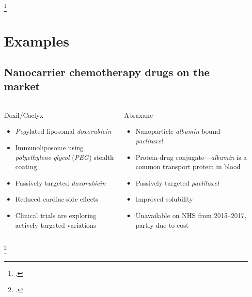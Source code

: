 \documentclass[aspectratio=169,compress]{beamer}
\newcommand*{\autotitle}{\subsecname\hfill\textbf{\small\secname}}
\begin{document}
\begin{frame}[fragile]{\autotitle}
\begin{columns}
  \end{columns}
  \footcitetext{maeda2000tumor,sun2014engineered}
\end{frame}


\section{Examples}

\subsection{Nanocarrier chemotherapy drugs on the market}
\begin{frame}{\autotitle}
  \begin{columns}
      \begin{block}{Doxil\textsuperscript{\textregistered}/Caelyx\textsuperscript{\textregistered}~}
        \begin{itemize}
          \item \alert{\emph{Peg}ylated liposomal \emph{doxorubicin}}
          \item \alert{Immunoliposome} using \emph{polyethylene glycol} (\emph{PEG}) stealth coating
          \item \alert{Passively targeted} \emph{doxorubicin}
          \item Reduced cardiac side effects~
          \item Clinical trials are exploring \alert{actively targeted variations}~
        \end{itemize}
      \end{block}

      \begin{block}{Abraxane\textsuperscript{\textregistered}~}
        \begin{itemize}
          \item \alert{Nanoparticle \emph{albumin}-bound \emph{paclitaxel}}
          \item \alert{Protein-drug conjugate}---\emph{albumin} is a common transport protein in blood
          \item \alert{Passively targeted} \emph{paclitaxel}
          \item Improved solubility~
          \item Unavailable on NHS from 2015--2017, partly due to cost~
        \end{itemize}
      \end{block}

  \end{columns}
  \footcitetext{wicki2015nanomedicine,harrison1995liposomal,mamot2012tolerability,desai2006increased,nice2015paclitaxel}
\end{frame}
\end{document}

